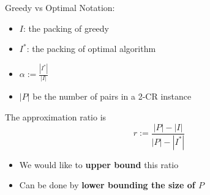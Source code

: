 \begin{frame}{Greedy vs Optimal}
Notation:
\begin{itemize}
\pause\item
\textbf{$I$}: the packing of greedy

\pause\item
\textbf{$I^*$}: the packing of optimal algorithm

\pause\item
$\alpha := \frac{|I^*|}{|I|}$ 

\pause\item
$|P|$ be the number of pairs in a 2-CR instance

\end{itemize}

\pause
\begin{observation}
The approximation ratio is
$$ r := \frac{|P| - |I|}{|P| - |I^*|} $$
\end{observation}

\begin{itemize}
\pause\item
We would like to \textbf{upper bound} this ratio
\pause\item
Can be done by \textbf{lower bounding the size of $P$}
\end{itemize}


\end{frame}